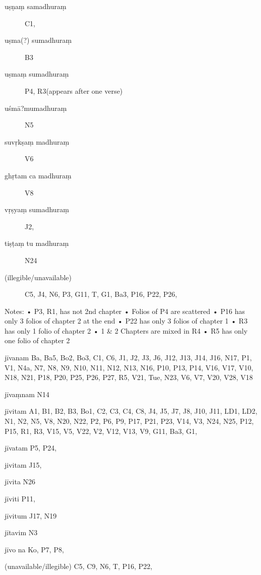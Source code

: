 \begin{ekdosis}
\begin{marma}[hp01_055]
\begin{marma}[hp01_063]
\begin{description}
\item[uṣṇaṃ samadhuraṃ]    C1,
\item[uṣma(?) sumadhuraṃ]    B3
\item[uṣmaṃ sumadhuraṃ]    P4, R3(appears after one verse)
\item[uśmā?mumadhuraṃ]  N5
\item[suvṛkṣaṃ madhuraṃ]    V6
\item[ghṛtam ca madhuraṃ]    V8
\item[vṛṣyaṃ sumadhuraṃ]    J2,
\item[tiṣṭaṃ tu madhuraṃ]  N24
\item[(illegible/unavailable)]   C5, J4, N6, P3, G11, T, G1, Ba3, P16, P22, P26,
    \end{description}
 \end{marma}

Notes:
    • P3, R1, has not 2nd chapter
    • Folios of P4 are scattered 
    • P16 has only 3 folios of chapter 2 at the end
    • P22 has only 3 folios of chapter 1
    • R3 has only 1 folio of chapter 2
    • 1 & 2 Chapters are mixed in R4
    • R5 has only one folio of chapter 2
\begin{marma}[hp02_003]
\item[jīvanam] Ba, Ba5, Bo2, Bo3, C1, C6, J1, J2, J3, J6, J12, J13, J14, J16, N17, P1, V1, N4a, N7, N8, N9, N10, N11, N12, N13, N16, P10, P13, P14, V16, V17, V10, N18, N21, P18, P20, P25, P26, P27, R5, V21, Tue, N23, V6, V7, V20, V28, V18
\item[jīvaṃnam] N14
\item[jīvitam] A1, B1, B2, B3, Bo1, C2, C3, C4, C8, J4, J5, J7, J8, J10, J11, LD1, LD2, N1, N2, N5, V8, N20, N22, P2, P6, P9, P17, P21, P23, V14, V3, N24, N25, P12, P15, R1, R3, V15, V5, V22, V2, V12, V13, V9, G11, Ba3, G1,
\item[jīvatam] P5, P24,
\item[jivitam] J15,
\item[jīvita] N26
\item[jīviti] P11, 
\item[jīvitum] J17, N19
\item[jītavim] N3
\item[jīvo na] Ko, P7, P8, 
\item[(unavailable/illegible)] C5, C9, N6, T, P16, P22,

  \begin{description}

    \end{description}
 \end{marma}


\end{marma}
\end{ekdosis}
